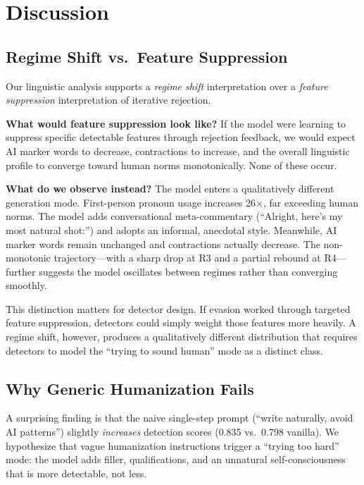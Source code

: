 \section{Discussion}
\label{sec:discussion}

\subsection{Regime Shift vs.\ Feature Suppression}
\label{sec:mechanism}

Our linguistic analysis supports a \emph{regime shift} interpretation over a \emph{feature suppression} interpretation of iterative rejection.

{\bf What would feature suppression look like?}
If the model were learning to suppress specific detectable features through rejection feedback, we would expect AI marker words to decrease, contractions to increase, and the overall linguistic profile to converge toward human norms monotonically. None of these occur.

{\bf What do we observe instead?}
The model enters a qualitatively different generation mode. First-person pronoun usage increases 26$\times$, far exceeding human norms. The model adds conversational meta-commentary (``Alright, here's my most natural shot:'') and adopts an informal, anecdotal style. Meanwhile, AI marker words remain unchanged and contractions actually decrease. The non-monotonic trajectory---with a sharp drop at R3 and a partial rebound at R4---further suggests the model oscillates between regimes rather than converging smoothly.

This distinction matters for detector design. If evasion worked through targeted feature suppression, detectors could simply weight those features more heavily. A regime shift, however, produces a qualitatively different distribution that requires detectors to model the ``trying to sound human'' mode as a distinct class.

\subsection{Why Generic Humanization Fails}
\label{sec:generic_fails}

A surprising finding is that the naive single-step prompt (``write naturally, avoid AI patterns'') slightly \emph{increases} \binoculars detection scores (0.835 vs.\ 0.798 vanilla). We hypothesize that vague humanization instructions trigger a ``trying too hard'' mode: the model adds filler, qualifications, and an unnatural self-consciousness that is more detectable, not less.

